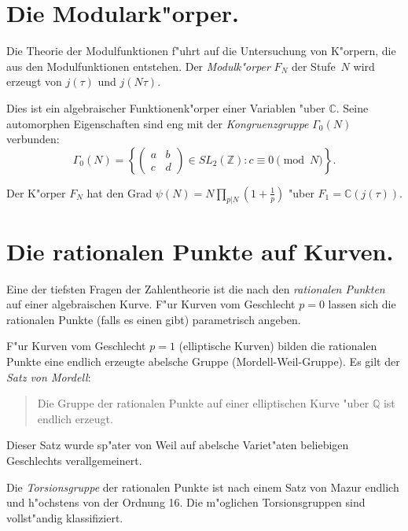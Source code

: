 \documentclass[12pt,a4paper]{article}
\theoremstyle{definition}
\begin{document}
\section{Die Modulark"orper.}

Die Theorie der Modulfunktionen f"uhrt auf die Untersuchung von K"orpern, die aus den Modulfunktionen entstehen. Der \emph{Modulk"orper} $F_N$ der Stufe~$N$ wird erzeugt von $j(\tau)$ und $j(N\tau)$.

Dies ist ein algebraischer Funktionenk"orper einer Variablen "uber $\mathbb{C}$. Seine automorphen Eigenschaften sind eng mit der \emph{Kongruenzgruppe} $\Gamma_0(N)$ verbunden:
\begin{equation}\tag{1}
\Gamma_0(N) = \left\{\begin{pmatrix} a & b \\ c & d \end{pmatrix} \in SL_2(\mathbb{Z}) : c \equiv 0 \pmod{N}\right\}.
\end{equation}

Der K"orper $F_N$ hat den Grad $\psi(N) = N\prod_{p|N}(1+\frac{1}{p})$ "uber $F_1 = \mathbb{C}(j(\tau))$.

\newpage

\section{Die rationalen Punkte auf Kurven.}

Eine der tiefsten Fragen der Zahlentheorie ist die nach den \emph{rationalen Punkten} auf einer algebraischen Kurve. F"ur Kurven vom Geschlecht $p = 0$ lassen sich die rationalen Punkte (falls es einen gibt) parametrisch angeben.

F"ur Kurven vom Geschlecht $p = 1$ (elliptische Kurven) bilden die rationalen Punkte eine endlich erzeugte abelsche Gruppe (Mordell-Weil-Gruppe). Es gilt der \emph{Satz von Mordell}:
\begin{quote}
Die Gruppe der rationalen Punkte auf einer elliptischen Kurve "uber $\mathbb{Q}$ ist endlich erzeugt.
\end{quote}

Dieser Satz wurde sp"ater von Weil auf abelsche Variet"aten beliebigen Geschlechts verallgemeinert.

\newpage

Die \emph{Torsionsgruppe} der rationalen Punkte ist nach einem Satz von Mazur endlich und h"ochstens von der Ordnung 16. Die m"oglichen Torsionsgruppen sind vollst"andig klassifiziert.
\end{document}
